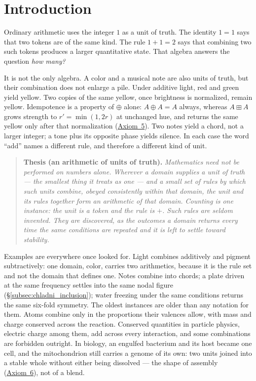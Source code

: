 \documentclass[12pt, a4paper]{article}
\begin{document}
\section{Introduction}

Ordinary arithmetic uses the integer $1$ as a unit of truth.
The identity $1=1$ says that two tokens are of the same kind.
The rule $1+1=2$ says that combining two such tokens produces a
larger quantitative state. That algebra answers the question
\emph{how many?}

It is not the only algebra. A color and a musical note are also
units of truth, but their combination does not enlarge a pile.
Under additive light, red and green yield yellow. Two copies of
the same yellow, once brightness is normalized, remain yellow.
Idempotence is a property of $\oplus$ alone: $A\oplus A=A$ always,
whereas $A\boxplus A$ grows strength to $r'=\min(1,2r)$ at unchanged
hue, and returns the same yellow only after that normalization
(\hyperref[subsec:axiom_interference]{Axiom~5}).
Two notes yield a chord, not a larger integer; a tone plus its
opposite phase yields silence. In each case the word ``add''
names a different rule, and therefore a different kind of unit.

\begin{quote}
\textbf{Thesis (an arithmetic of units of truth).}
\emph{Mathematics need not be performed on numbers alone. Wherever a
domain supplies a unit of truth --- the smallest thing it treats as
one --- and a small set of rules by which such units combine, obeyed
consistently within that domain, the unit and its rules together form
an arithmetic of that domain. Counting is one instance: the unit is a
token and the rule is $+$. Such rules are seldom invented. They are
discovered, as the outcomes a domain returns every time the same
conditions are repeated and it is left to settle toward stability.}
\end{quote}

Examples are everywhere once looked for. Light combines additively
and pigment subtractively: one domain, color, carries two
arithmetics, because it is the rule set and not the domain that
defines one. Notes combine into chords; a plate driven at the same
frequency settles into the same nodal figure
(\S\ref{subsec:chladni_inclusion}); water freezing under the same
conditions returns the same six-fold symmetry. The oldest instances
are older than any notation for them. Atoms combine only in the
proportions their valences allow, with mass and charge conserved
across the reaction. Conserved quantities in particle physics,
electric charge among them, add across every interaction, and some
combinations are forbidden outright. In biology, an engulfed
bacterium and its host became one cell, and the mitochondrion still
carries a genome of its own: two units joined into a stable whole
without either being dissolved --- the shape of assembly
(\hyperref[subsec:axiom_assembly]{Axiom~6}), not of a blend.
\end{document}
